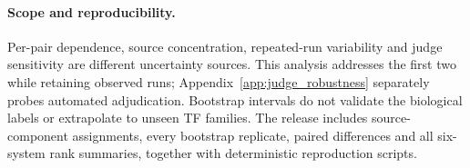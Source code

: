 \paragraph{Scope and reproducibility.} Per-pair dependence, source concentration, repeated-run variability and judge sensitivity are different uncertainty sources. This analysis addresses the first two while retaining observed runs; Appendix~\ref{app:judge_robustness} separately probes automated adjudication. Bootstrap intervals do not validate the biological labels or extrapolate to unseen TF families. The release includes source-component assignments, every bootstrap replicate, paired differences and all six-system rank summaries, together with deterministic reproduction scripts.

